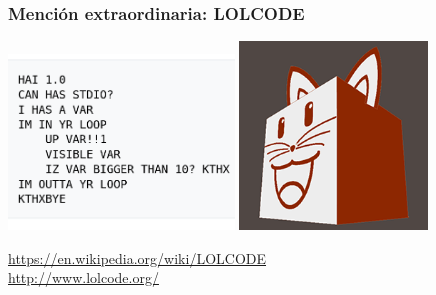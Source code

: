\begin{frame}
\frametitle{Mención extraordinaria: LOLCODE}

\begin{center}
  \includegraphics[width=6cm]{figs/obfuscated-lolcode-code}
  \includegraphics[width=5cm]{figs/obfuscated-lolcode-logo}
\end{center}

\begin{flushright}
{\footnotesize
\url{https://en.wikipedia.org/wiki/LOLCODE} \\
\url{http://www.lolcode.org/}
}
\end{flushright}

\end{frame}
